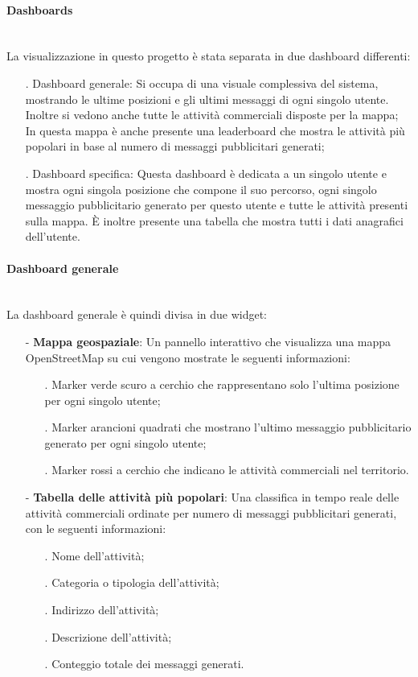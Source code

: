 \documentclass[10pt]{article}
\newcommand{\myparagraph}[1]{\paragraph{#1}\mbox{}\\}
\begin{document}
        \myparagraph{Dashboards}
        La visualizzazione in questo progetto è stata separata in due dashboard differenti:
        \begin{itemize}
            \item[.] Dashboard generale: Si occupa di una visuale complessiva del sistema, mostrando le ultime posizioni e gli ultimi messaggi di ogni singolo utente. Inoltre si vedono anche tutte le attività commerciali disposte per la mappa;
            In questa mappa è anche presente una leaderboard che mostra le attività più popolari in base al numero di messaggi pubblicitari generati;
            \item[.] Dashboard specifica: Questa dashboard è dedicata a un singolo utente e mostra ogni singola posizione che compone il suo percorso, ogni singolo messaggio pubblicitario generato per questo utente e tutte le attività presenti sulla mappa.
            È inoltre presente una tabella che mostra tutti i dati anagrafici dell'utente.
        \end{itemize}

        \myparagraph{Dashboard generale}
        La dashboard generale è quindi divisa in due widget:
        \begin{itemize}
            \item[-] \textbf{Mappa geospaziale}: Un pannello interattivo che visualizza una mappa OpenStreetMap su cui vengono mostrate le seguenti informazioni:
            \begin{itemize}
                \item[.] Marker verde scuro a cerchio che rappresentano solo l'ultima posizione per ogni singolo utente;
                \item[.] Marker arancioni quadrati che mostrano l'ultimo messaggio pubblicitario generato per ogni singolo utente;
                \item[.] Marker rossi a cerchio che indicano le attività commerciali nel territorio.
            \end{itemize}

            \item[-] \textbf{Tabella delle attività più popolari}: Una classifica in tempo reale delle attività commerciali ordinate per numero di messaggi pubblicitari generati, con le seguenti informazioni:
            \begin{itemize}
                \item[.] Nome dell'attività;
                \item[.] Categoria o tipologia dell'attività;
                \item[.] Indirizzo dell'attività;
                \item[.] Descrizione dell'attività;
                \item[.] Conteggio totale dei messaggi generati.
            \end{itemize}
        \end{itemize}
\end{document}
